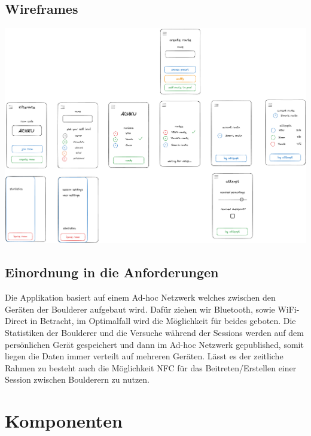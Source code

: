 \documentclass[11pt,a4paper,headsepline,footsepline,bibliography=totocnumbered]{article}
\begin{document}

  \subsection{Wireframes}
    \includegraphics[width=\textwidth]{pictures/KilterVote_GUI.png}

  \subsection{Einordnung in die Anforderungen}  
    \par  
      Die Applikation basiert auf einem Ad-hoc Netzwerk welches zwischen den Geräten der Boulderer aufgebaut wird.
      Dafür ziehen wir Bluetooth, sowie WiFi-Direct in Betracht, im Optimalfall wird die Möglichkeit für beides geboten.
      Die Statistiken der Boulderer und die Versuche während der Sessions werden auf dem persönlichen Gerät gespeichert und dann im Ad-hoc Netzwerk gepublished, somit liegen die Daten immer verteilt auf mehreren Geräten.
      Lässt es der zeitliche Rahmen zu besteht auch die Möglichkeit NFC für das Beitreten/Erstellen einer Session zwischen Boulderern zu nutzen.
    
\newpage

\section{Komponenten}
\end{document}
